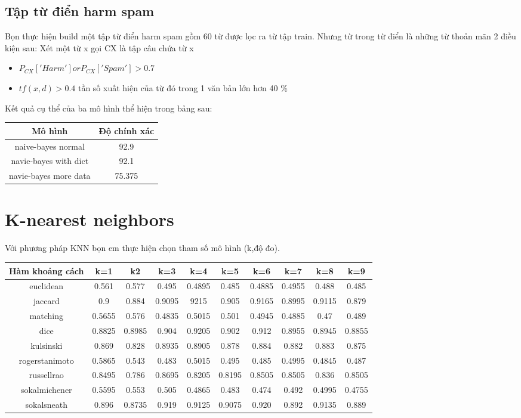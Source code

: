 \documentclass[a4paper,12pt]{report}
\begin{document}
\subsection{Tập từ điển harm spam}
Bọn thực hiện build một tập từ điển harm spam gồm 60 từ được lọc ra từ tập train. Nhưng từ trong từ điển là những từ thoản mãn 2 điều kiện sau:
Xét một từ x gọi CX là  tập câu chứa từ x
\begin{itemize}
\item $P_{CX}['Harm'] or P_{CX}['Spam'] >0.7$
\item $tf(x,d) >0.4$ tần số xuất hiện của từ đó trong 1 văn bản lớn hơn 40 \%
\end{itemize}
Kết quả cụ thể của ba mô hình thể hiện trong bảng sau:
\begin{longtable}{|c|c|}
\hline 
Mô hình & Độ chính xác \\ \hline
naive-bayes normal & 92.9\\ \hline
navie-bayes with dict & 92.1 \\ \hline
navie-bayes more data & 75.375\\ \hline
\end{longtable}


\section{K-nearest neighbors}
Với phương pháp KNN bọn em thực hiện chọn tham số mô hình (k,độ đo). 
\begin{longtable}{|c|c|c|c|c|c|c|c|c|c|}
\hline
Hàm khoảng cách & k=1 &k2& k=3&k=4 & k=5 &k=6 & k=7&k=8 & k=9\\
\hline
euclidean & 0.561&0.577 &0.495 &0.4895&0.485&0.4885&0.4955&0.488&0.485 \\
\hline 
jaccard & 0.9 &0.884& 0.9095 &9215& 0.905 & 0.9165& 0.8995 &0.9115& 0.879 \\ \hline
matching & 0.5655 &0.576& 0.4835 & 0.5015&  0.501 & 0.4945&0.4885 &0.47& 0.489 \\ \hline 
dice &0.8825 &0.8985& 0.904 &0.9205&  0.902 & 0.912& 0.8955 &0.8945& 0.8855 \\ \hline
kulsinski&  0.869 & 0.828& 0.8935&0.8905&  0.878& 0.884& 0.882 & 0.883& 0.875 \\ \hline 
rogerstanimoto&  0.5865& 0.543& 0.483&0.5015& 0.495 & 0.485&0.4995& 0.4845& 0.487 \\ \hline
russellrao&  0.8495&0.786& 0.8695& 0.8205&0.8195 &0.8505  &0.8505& 0.836& 0.8505 \\ \hline 
sokalmichener& 0.5595&0.553& 0.505 & 0.4865 &0.483 &0.474 &0.492& 0.4995 &0.4755 \\ \hline 
sokalsneath& 0.896& 0.8735& 0.919 &0.9125 & 0.9075&0.920& 0.892 & 0.9135& 0.889 \\ \hline
\end{longtable}
\end{document}
